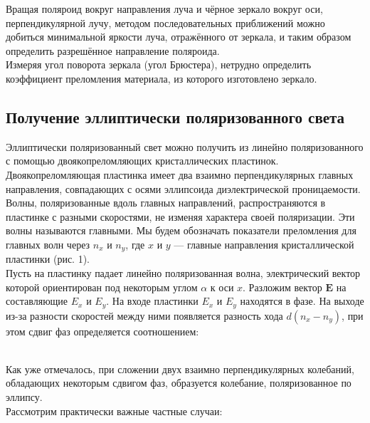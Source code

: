 Вращая поляроид вокруг направления луча и чёрное зеркало вокруг оси, перпендикулярной лучу,
методом последовательных приближений можно добиться минимальной яркости луча, отражённого
от зеркала, и таким образом определить разрешённое направление поляроида. \\

Измеряя угол поворота зеркала (угол Брюстера), нетрудно определить коэффициент преломления
материала, из которого изготовлено зеркало.

\subsection{Получение эллиптически поляризованного света}

Эллиптически поляризованный свет можно получить из линейно поляризованного с помощью
двоякопреломляющих кристаллических пластинок. \\

Двоякопреломляющая пластинка имеет два взаимно перпендикулярных главных направления,
совпадающих с осями эллипсоида диэлектрической проницаемости. Волны, поляризованные вдоль
главных направлений, распространяются в пластинке с разными скоростями, не изменяя характера
своей поляризации. Эти волны называются главными. Мы будем обозначать показатели преломления
для главных волн через $ n_x $ и $ n_y $, где $ x $ и $ y $ --- главные направления
кристаллической пластинки (рис. 1). \\

Пусть на пластинку падает линейно поляризованная волна, электрический вектор которой
ориентирован под некоторым углом $ \alpha $ к оси $ x $. Разложим вектор $ \mathbf{E} $
на составляющие $ E_x $ и $ E_y $. На входе пластинки $ E_x $ и $ E_y $ находятся в фазе.
На выходе из-за разности скоростей между ними появляется разность хода $ d(n_x - n_y) $,
при этом сдвиг фаз определяется соотношением:

 \\

Как уже отмечалось, при сложении двух взаимно перпендикулярных колебаний, обладающих
некоторым сдвигом фаз, образуется колебание, поляризованное по эллипсу. \\

Рассмотрим практически важные частные случаи:

